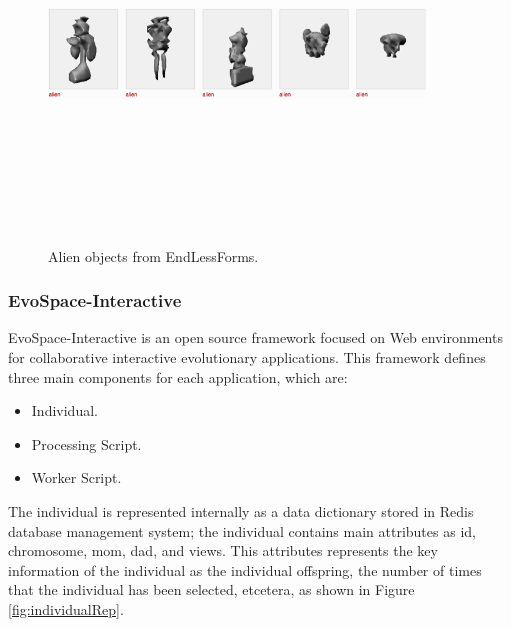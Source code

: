 \begin{figure}
\captionsetup{justification=centering,margin=2cm}
\centering
\setlength\fboxsep{0pt}
\setlength\fboxrule{0.7pt}
\includegraphics[width=10cm,height=10cm,keepaspectratio]{img/EndlessForms.png}
\caption{Alien objects from EndLessForms.}
\label{fig:EndlessForms}
\end{figure}

\subsubsection{EvoSpace-Interactive} EvoSpace-Interactive is an open source
framework focused on Web environments for collaborative interactive evolutionary
applications. This framework defines three main components for each application,
which are:
\begin{itemize}
	\item Individual.
	\item Processing Script.
	\item Worker Script.
\end{itemize}

The individual is represented internally as a data dictionary stored in Redis
\cite{redis} database management system; the individual contains main attributes as id,
chromosome, mom, dad, and views. This attributes represents the key information
of the individual as the individual offspring, the number of times that the
individual has been selected, etcetera, as shown in Figure \ref{fig:individualRep}.

